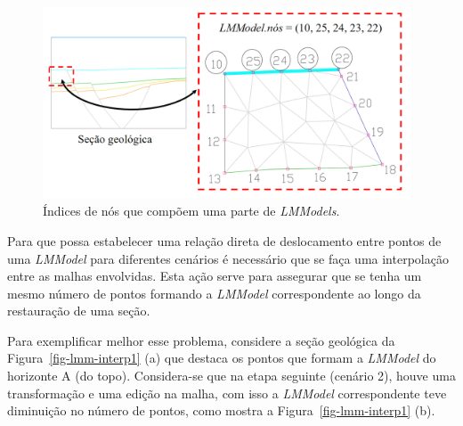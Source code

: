 \begin{figure} [H]
  \begin{center}
    \includegraphics[width=310pt]{images/fig-lmm-mesh-boundary}
    \caption{Índices de nós que compõem uma parte de \textit{LMModels}.}\label{fig-lmm-mesh-boundary}
  \end{center}
\end{figure}

Para que possa estabelecer uma relação direta de deslocamento entre pontos de uma \textit{LMModel} para diferentes cenários é necessário que se faça uma interpolação entre as malhas envolvidas. Esta ação serve para assegurar que se tenha um mesmo número de pontos formando a \textit{LMModel} correspondente ao longo da restauração de uma seção.

Para exemplificar melhor esse problema, considere a seção geológica da Figura~\ref{fig-lmm-interp1} (a) que destaca os pontos que formam a \textit{LMModel} do horizonte A (do topo). Considera-se que na etapa seguinte (cenário 2), houve uma transformação e uma edição na malha, com isso a \textit{LMModel} correspondente teve diminuição no número de pontos, como mostra a Figura~\ref{fig-lmm-interp1} (b).

